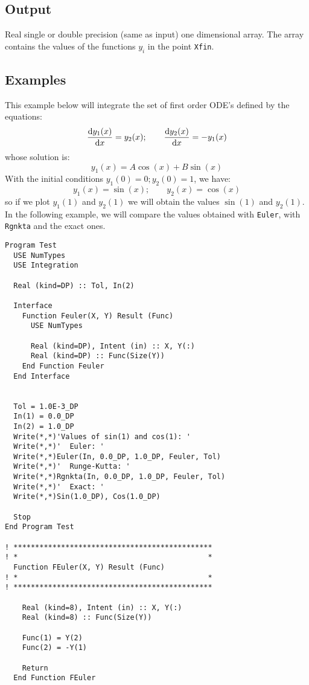 \subsection{Output}

Real single or double precision (same as input) one dimensional
array. The array contains the values of the functions $y_i$ in the
point \texttt{Xfin}. 

\subsection{Examples}

This example below will integrate the set of first order ODE's defined
by the equations:
\begin{displaymath}
  \frac{\mathrm{d} y_1(x)}{\mathrm{d} x} = y_2(x);\qquad
  \frac{\mathrm{d} y_2(x)}{\mathrm{d} x} = -y_1(x)    
\end{displaymath}
whose solution is:
\begin{displaymath}
  y_1(x) = A\cos(x) + B\sin(x)
\end{displaymath}
With the initial conditions $y_1(0) = 0; y_2(0)=1$, we have:
\begin{displaymath}
  y_1(x) = \sin(x);\qquad y_2(x) = \cos(x)
\end{displaymath}
so if we plot $y_1(1)$ and $y_2(1)$ we will obtain the values
$\sin(1)$ and $y_2(1)$. In the following example, we will compare the
values obtained with \texttt{Euler}, with \texttt{Rgnkta} and the
exact ones. 

\begin{lstlisting}[emph=Rgnkta,
                   emphstyle=\color{blue},
                   frame=trBL,
                   caption=Integrating differential equations with the
                   Runge-Kutta method,
                   label=rgnkta]
Program Test
  USE NumTypes
  USE Integration

  Real (kind=DP) :: Tol, In(2)

  Interface
    Function Feuler(X, Y) Result (Func)
      USE NumTypes

      Real (kind=DP), Intent (in) :: X, Y(:)
      Real (kind=DP) :: Func(Size(Y))
    End Function Feuler
  End Interface


  Tol = 1.0E-3_DP
  In(1) = 0.0_DP
  In(2) = 1.0_DP
  Write(*,*)'Values of sin(1) and cos(1): '
  Write(*,*)'  Euler: '
  Write(*,*)Euler(In, 0.0_DP, 1.0_DP, Feuler, Tol)
  Write(*,*)'  Runge-Kutta: '
  Write(*,*)Rgnkta(In, 0.0_DP, 1.0_DP, Feuler, Tol)
  Write(*,*)'  Exact: '
  Write(*,*)Sin(1.0_DP), Cos(1.0_DP)

  Stop
End Program Test

! **********************************************  
! *                                            *
  Function FEuler(X, Y) Result (Func)
! *                                            *
! **********************************************

    Real (kind=8), Intent (in) :: X, Y(:)
    Real (kind=8) :: Func(Size(Y))

    Func(1) = Y(2)
    Func(2) = -Y(1)
    
    Return
  End Function FEuler
\end{lstlisting}


